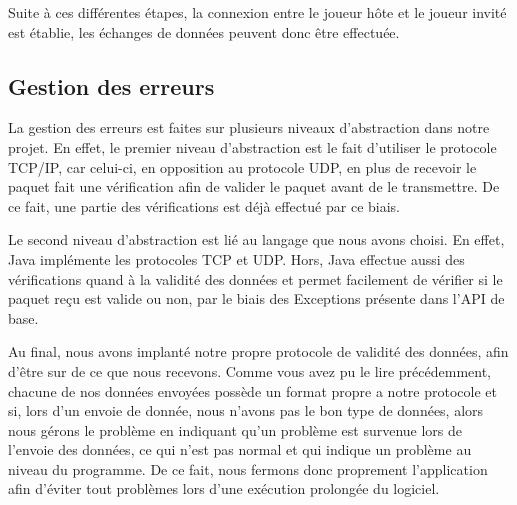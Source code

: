 			Suite à ces différentes étapes, la connexion entre le joueur hôte et le joueur invité est établie, les échanges de données peuvent donc être effectuée.


\subsection{Gestion des erreurs}
	La gestion des erreurs est faites sur plusieurs niveaux d'abstraction dans notre projet. En effet, le premier niveau d'abstraction est le fait d'utiliser le protocole TCP/IP, car celui-ci, en opposition au protocole UDP, en plus de recevoir le paquet fait une vérification afin de valider le paquet avant de le transmettre. De ce fait, une partie des vérifications est déjà effectué par ce biais.\newline
	
	Le second niveau d'abstraction est lié au langage que nous avons choisi. En effet, Java implémente les protocoles TCP et UDP. Hors, Java effectue aussi des vérifications quand à la validité des données et permet facilement de vérifier si le paquet reçu est valide ou non, par le biais des Exceptions présente dans l'API de base.\newline
	
	Au final, nous avons implanté notre propre protocole de validité des données, afin d'être sur de ce que nous recevons. Comme vous avez pu le lire précédemment, chacune de nos données envoyées possède un format propre a notre protocole et si, lors d'un envoie de donnée, nous n'avons pas le bon type de données, alors nous gérons le problème en indiquant qu'un problème est survenue lors de l'envoie des données, ce qui n'est pas normal et qui indique un problème au niveau du programme. De ce fait, nous fermons donc proprement l'application afin d'éviter tout problèmes lors d'une exécution prolongée du logiciel.
